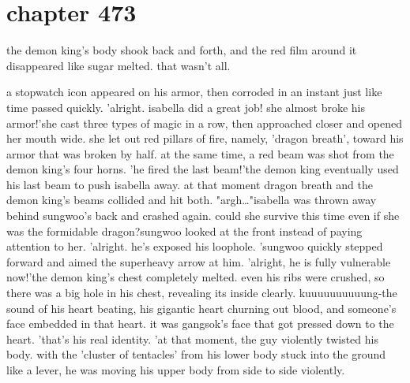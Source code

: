 \section{chapter 473}

the demon king's body shook back and forth, and the red film around it disappeared like sugar melted.
 that wasn't all.





a stopwatch icon appeared on his armor, then corroded in an instant just like time passed quickly.
'alright.
 isabella did a great job! she almost broke his armor!'she cast three types of magic in a row, then approached closer and opened her mouth wide.
 she let out red pillars of fire, namely, 'dragon breath', toward his armor that was broken by half.
 at the same time, a red beam was shot from the demon king's four horns.
'he fired the last beam!'the demon king eventually used his last beam to push isabella away.
at that moment dragon breath and the demon king's beams collided and hit both.
"argh…"isabella was thrown away behind sungwoo's back and crashed again.
could she survive this time even if she was the formidable dragon?sungwoo looked at the front instead of paying attention to her.
'alright.
 he's exposed his loophole.
'sungwoo quickly stepped forward and aimed the superheavy arrow at him.
'alright, he is fully vulnerable now!'the demon king's chest completely melted.
 even his ribs were crushed, so there was a big hole in his chest, revealing its inside clearly.
kuuuuuuuuuung-the sound of his heart beating, his gigantic heart churning out blood, and someone's face embedded in that heart.
 it was gangsok's face that got pressed down to the heart.
'that's his real identity.
'at that moment, the guy violently twisted his body.
with the 'cluster of tentacles' from his lower body stuck into the ground like a lever, he was moving his upper body from side to side violently.

